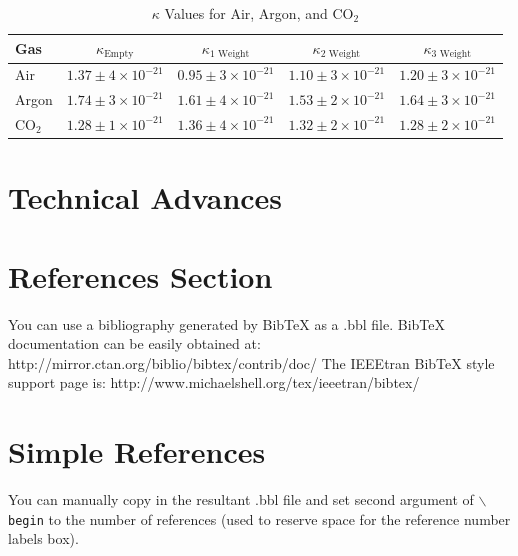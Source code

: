 \documentclass[lettersize,journal]{IEEEtran}
\begin{document}
	
	\begin{table}[!htbp]
		\centering
		\caption{$\kappa$ Values for Air, Argon, and CO$_2$}
		\label{tab:kappa_values}
		\begin{tabular}{lcccc}
			\toprule
			Gas & $\kappa_\text{Empty}$ & $\kappa_\text{1 Weight}$ & $\kappa_\text{2 Weight}$ & $\kappa_\text{3 Weight}$ \\ 
			\midrule
			Air & $1.37 \pm 4 \times 10^{-21}$ & $0.95 \pm 3 \times 10^{-21}$ & $1.10 \pm 3 \times 10^{-21}$ & $1.20 \pm 3 \times 10^{-21}$ \\
			Argon & $1.74 \pm 3 \times 10^{-21}$ & $1.61 \pm 4 \times 10^{-21}$ & $1.53 \pm 2 \times 10^{-21}$ & $1.64 \pm 3 \times 10^{-21}$ \\
			CO$_2$ & $1.28 \pm 1 \times 10^{-21}$ & $1.36 \pm 4 \times 10^{-21}$ & $1.32 \pm 2 \times 10^{-21}$ & $1.28 \pm 2 \times 10^{-21}$ \\
			\bottomrule
		\end{tabular}
	\end{table}
	
	\section{Technical Advances}
	
	
	
	
	
	\section{References Section}
	You can use a bibliography generated by BibTeX as a .bbl file.
	BibTeX documentation can be easily obtained at:
	http://mirror.ctan.org/biblio/bibtex/contrib/doc/
	The IEEEtran BibTeX style support page is:
	http://www.michaelshell.org/tex/ieeetran/bibtex/
	
	\section{Simple References}
	You can manually copy in the resultant .bbl file and set second argument of $\backslash${\tt{begin}} to the number of references
	(used to reserve space for the reference number labels box).
	
\end{document}
